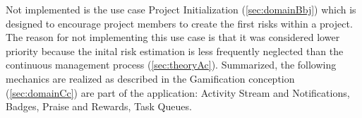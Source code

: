 Not implemented is the use case Project Initialization (\ref{sec:domainBbj}) which is designed to encourage project members to create the first risks within a project. The reason for not implementing this use case is that it was considered lower priority because the inital risk estimation is less frequently neglected than the continuous management process (\ref{sec:theoryAc}).
Summarized, the following mechanics are realized as described in the Gamification conception (\ref{sec:domainCc}) are part of the application: Activity Stream and Notifications, Badges, Praise and Rewards, Task Queues.
